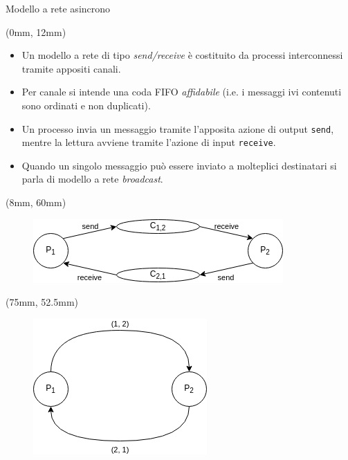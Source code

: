 \documentclass{beamer}
\begin{document}
    \begin{frame}{Modello a rete asincrono}
        \begin{textblock*}{\textwidth}
            (0mm, 12mm)
            \begin{itemize}
                \item Un modello a rete di tipo \textit{send/receive} è costituito da processi interconnessi tramite appositi canali.
                \item Per canale si intende una coda FIFO \textit{affidabile} (i.e. i messaggi ivi contenuti sono ordinati e non duplicati).
                \item Un processo invia un messaggio tramite l'apposita azione di output \texttt{send}, mentre la lettura avviene tramite l'azione di input \texttt{receive}.
                \item Quando un singolo messaggio può essere inviato a molteplici destinatari si parla di modello a rete \textit{broadcast}.
            \end{itemize}
        \end{textblock*} 

        \begin{textblock*}{0.45\textwidth}
            (8mm, 60mm)
            \begin{block}{}
                \begin{figure}
                    \centering
                    \includegraphics[scale=0.4]{modello_a_rete.png}
                \end{figure}
            \end{block}
        \end{textblock*}
        \begin{textblock*}{0.3\textwidth}
            (75mm, 52.5mm)
            \begin{block}{}
                \begin{figure}
                    \centering
                    \includegraphics[scale=0.4]{modello_a_rete_digrafo.png}
                \end{figure}
            \end{block}
        \end{textblock*}
    \end{frame}
\end{document}
